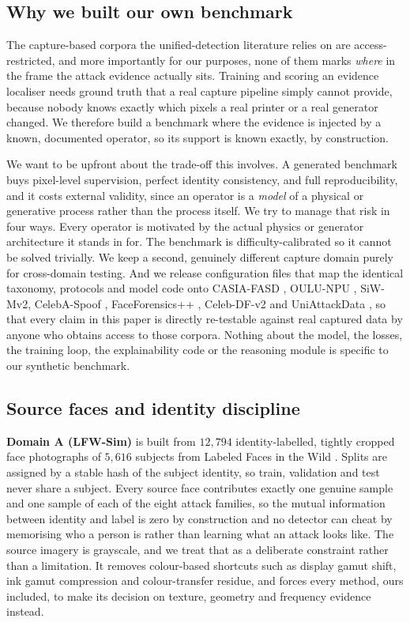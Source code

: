 \documentclass[conference]{IEEEtran}
\begin{document}
\subsection{Why we built our own benchmark}
The capture-based corpora the unified-detection literature relies on
\cite{yu2024unified,ma2025uniattackplus} are access-restricted, and more
importantly for our purposes, none of them marks \emph{where} in the frame the
attack evidence actually sits. Training and scoring an evidence localiser needs
ground truth that a real capture pipeline simply cannot provide, because nobody
knows exactly which pixels a real printer or a real generator changed. We therefore
build a benchmark where the evidence is injected by a known, documented operator, so
its support is known exactly, by construction.

We want to be upfront about the trade-off this involves. A generated benchmark buys
pixel-level supervision, perfect identity consistency, and full reproducibility, and
it costs external validity, since an operator is a \emph{model} of a physical or
generative process rather than the process itself. We try to manage that risk in
four ways. Every operator is motivated by the actual physics or generator
architecture it stands in for. The benchmark is difficulty-calibrated so it cannot
be solved trivially. We keep a second, genuinely different capture domain purely
for cross-domain testing. And we release configuration files that map the identical
taxonomy, protocols and model code onto CASIA-FASD \cite{zhang2012casia}, OULU-NPU
\cite{boulkenafet2017oulu}, SiW-Mv2, CelebA-Spoof \cite{zhang2020celebaspoof},
FaceForensics++ \cite{rossler2019ff}, Celeb-DF-v2 \cite{li2020celebdf} and
UniAttackData \cite{yu2024unified}, so that every claim in this paper is directly
re-testable against real captured data by anyone who obtains access to those
corpora. Nothing about the model, the losses, the training loop, the
explainability code or the reasoning module is specific to our synthetic benchmark.

\subsection{Source faces and identity discipline}
\textbf{Domain A (LFW-Sim)} is built from $12{,}794$ identity-labelled, tightly
cropped face photographs of $5{,}616$ subjects from Labeled Faces in the Wild
\cite{huang2007lfw}. Splits are assigned by a stable hash of the subject identity,
so train, validation and test never share a subject. Every source face contributes
exactly one genuine sample and one sample of each of the eight attack families, so
the mutual information between identity and label is zero by construction and no
detector can cheat by memorising who a person is rather than learning what an attack
looks like. The source imagery is grayscale, and we treat that as a deliberate
constraint rather than a limitation. It removes colour-based shortcuts such as
display gamut shift, ink gamut compression and colour-transfer residue, and forces
every method, ours included, to make its decision on texture, geometry and frequency
evidence instead.
\end{document}
